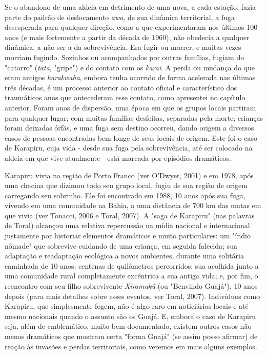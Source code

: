 Se o abandono de uma aldeia em detrimento de uma nova, a cada estação,
fazia parte do padrão de deslocamento \emph{awa}, de sua dinâmica
territorial, a fuga desesperada para qualquer direção, como a que
experimentaram nos últimos 100 anos (e mais fortemente a partir da
década de 1960), não obedecia a qualquer dinâmica, a não ser a da
sobrevivência. Era fugir ou morrer, e muitas vezes morriam fugindo.
Sozinhos ou acompanhados por outras famílias, fugiam do "catarro"
(\emph{tata}, "gripe") e do contato com os \emph{karai}. A perda ou
mudança do que eram antigos \emph{harakwaha}, embora tenha ocorrido de
forma acelerada nas últimas três décadas, é um processo anterior ao
contato oficial e característico dos traumáticos anos que antecederam
esse contato, como apresentei no capítulo anterior. Foram anos de
dispersão, uma época em que os grupos locais partiram para qualquer
lugar; com muitas famílias desfeitas, separadas pela morte; crianças
foram deixadas órfãs, e uma fuga sem destino ocorreu, dando origem a
diversos casos de pessoas encontradas bem longe de seus locais de
origem. Este foi o caso de Karapiru, cuja vida - desde sua fuga pela
sobrevivência, até ser colocado na aldeia em que vive atualmente - está
marcada por episódios dramáticos.

Karapiru vivia na região de Porto Franco (ver O'Dwyer, 2001) e em 1978,
após uma chacina que dizimou todo seu grupo local, fugiu de sua região
de origem carregando seu sobrinho. Ele foi encontrado em 1988, 10 anos
após sua fuga, vivendo em uma comunidade na Bahia, a uma distância de
700 km das matas em que vivia (ver Tonacci, 2006 e Toral, 2007). A "saga
de Karapiru" (nas palavras de Toral) alcançou uma relativa repercussão
na mídia nacional e internacional justamente por historiar elementos
dramáticos e muito particulares: um "índio nômade" que sobrevive
cuidando de uma criança, em seguida falecida; sua adaptação e
readaptação ecológica a novos ambientes, durante uma solitária caminhada
de 10 anos; centenas de quilômetros percorridos; sua acolhida junto a
uma comunidade rural completamente excêntrica a sua antiga vida; e, por
fim, o reencontro com seu filho sobrevivente \emph{Xiramukũ} (ou
"Benvindo Guajá"), 10 anos depois (para mais detalhes sobre esses
eventos, ver Toral, 2007). Indivíduos como Karapiru, que simplesmente
fogem, não é algo raro em noticiários locais e até mesmo nacionais
quando o assunto são os Guajá. E, embora o caso de Karapiru seja, além
de emblemático, muito bem documentado, existem outros casos não menos
dramáticos que mostram certa "forma Guajá" (se assim posso afirmar) de
reação às invasões e perdas territoriais, como veremos em mais alguns
exemplos.

